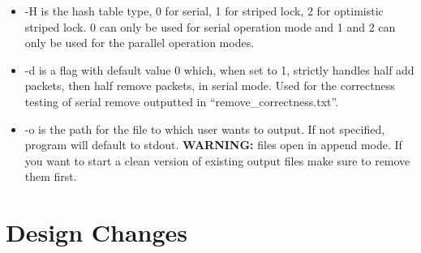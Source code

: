 \documentclass{article}
\begin{document}
\begin{adjustwidth}{-2cm}{-2cm}
\begin{itemize}
	\item -H is the hash table type, 0 for serial, 1 for striped lock, 2 for optimistic striped lock. 0 can only be used for serial operation mode and 1 and 2 can only be used for the parallel operation modes.
	\item -d is a flag with default value 0 which, when set to 1, strictly handles half add packets, then half remove packets, in serial mode. Used for the correctness testing of serial remove outputted in ``remove\_correctness.txt''.
	\item -o is the path for the file to which user wants to output. If not specified, program will default to stdout. \textbf{WARNING:} files open in append mode. If you want to start a clean version of existing output files make sure to remove them first.
\end{itemize} 

\section{Design Changes}

\end{adjustwidth}
\end{document}
